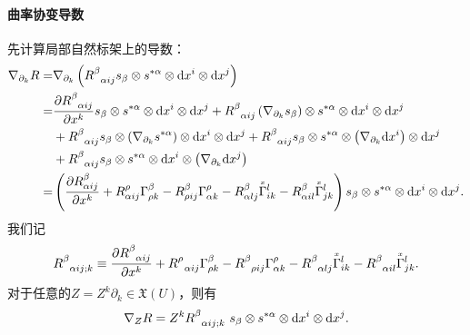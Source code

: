 \paragraph{曲率协变导数} 先计算局部自然标架上的导数：
\begin{align*}
	\nabla_{\partial_k} R = & \nabla_{\partial_k}\left(	R_{\hphantom{\alpha}\alpha i j}^\beta 
	s_\beta \otimes s^{*\alpha}\otimes {\rm d}x^i \otimes {\rm d}x^j \right) \\
	=& \frac{\partial R_{\hphantom{\alpha}\alpha i j}^\beta }{\partial x^k}
	s_\beta \otimes s^{*\alpha}\otimes {\rm d}x^i \otimes {\rm d}x^j 
	+ R_{\hphantom{\alpha}\alpha i j}^\beta \left( \nabla_{\partial_k} s_\beta \right)
	\otimes s^{*\alpha}\otimes {\rm d}x^i \otimes {\rm d}x^j \\
	& + R_{\hphantom{\alpha}\alpha i j}^\beta s_\beta \otimes 
	\left( \nabla_{\partial_k} s^{*\alpha} \right) \otimes {\rm d}x^i \otimes {\rm d}x^j 
	+ R_{\hphantom{\alpha}\alpha i j}^\beta s_\beta \otimes s^{*\alpha}\otimes  
	\left( \nabla_{\partial_k} {\rm d}x^i \right) \otimes  {\rm d}x^j \\
	&+ R_{\hphantom{\alpha}\alpha i j}^\beta s_\beta \otimes s^{*\alpha}\otimes {\rm d}x^i 
	\otimes \left( \nabla_{\partial_k} {\rm d}x^j \right) \\
	=&\left( \frac{\partial R_{\alpha i j}^\beta }{\partial x^k}
	+ R_{\alpha i j}^\rho \Gamma^\beta_{\rho k}
	- R_{\rho i j}^\beta \Gamma^\rho_{\alpha k}
	- R_{\alpha l j}^\beta \oversetmy{x}{\Gamma}^l_{i k}
	- R_{\alpha i l}^\beta \oversetmy{x}{\Gamma}^l_{j k}	\right)
	s_\beta \otimes s^{*\alpha}\otimes {\rm d}x^i \otimes {\rm d}x^j .
\end{align*}
我们记
\begin{equation}\label{chfb:eqn_RijDk}
	 R_{\hphantom{\alpha}\alpha i j ; k}^\beta \equiv 
	\frac{\partial R_{\hphantom{\alpha}\alpha i j}^\beta }{\partial x^k}
	+ R_{\hphantom{\alpha}\alpha i j}^\rho \Gamma^\beta_{\rho k}
	- R_{\hphantom{\alpha}\rho i j}^\beta \Gamma^\rho_{\alpha k}
	- R_{\hphantom{\alpha}\alpha l j}^\beta \oversetmy{x}{\Gamma}^l_{i k}
	- R_{\hphantom{\alpha}\alpha i l}^\beta \oversetmy{x}{\Gamma}^l_{j k} .
\end{equation}
对于任意的$ Z = Z^k \partial_k \in \mathfrak{X}(U)$，则有
\begin{equation}\label{chfb:eqn_DZR}
	\nabla_{Z} R = Z^k R_{\hphantom{\alpha}\alpha i j ; k}^\beta \ 
	s_\beta \otimes s^{*\alpha}\otimes {\rm d}x^i \otimes {\rm d}x^j .
\end{equation}

